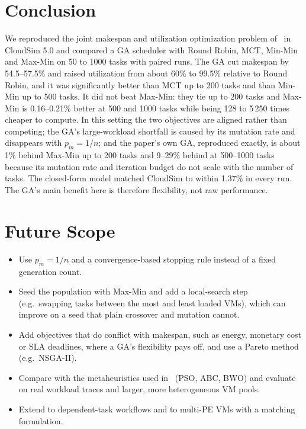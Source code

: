 \documentclass[journal,onecolumn,12pt]{IEEEtran}
\begin{document}
\section{Conclusion}
We reproduced the joint makespan and utilization optimization problem of~\cite{dehury} in CloudSim 5.0 and compared a GA scheduler with Round Robin, MCT, Min-Min and Max-Min on 50 to 1000 tasks with paired runs. The GA cut makespan by 54.5--57.5\% and raised utilization from about 60\% to 99.5\% relative to Round Robin, and it was significantly better than MCT up to 200 tasks and than Min-Min up to 500 tasks. It did not beat Max-Min: they tie up to 200 tasks and Max-Min is 0.16--0.21\% better at 500 and 1000 tasks while being 128 to 5\,250 times cheaper to compute. In this setting the two objectives are aligned rather than competing; the GA's large-workload shortfall is caused by its mutation rate and disappears with $p_m=1/n$; and the paper's own GA, reproduced exactly, is about 1\% behind Max-Min up to 200 tasks and 9--29\% behind at 500--1000 tasks because its mutation rate and iteration budget do not scale with the number of tasks. The closed-form model matched CloudSim to within 1.37\% in every run. The GA's main benefit here is therefore flexibility, not raw performance.

\section{Future Scope}
\begin{itemize}
\item Use $p_m=1/n$ and a convergence-based stopping rule instead of a fixed generation count.
\item Seed the population with Max-Min and add a local-search step (e.g.\ swapping tasks between the most and least loaded VMs), which can improve on a seed that plain crossover and mutation cannot.
\item Add objectives that do conflict with makespan, such as energy, monetary cost or SLA deadlines, where a GA's flexibility pays off, and use a Pareto method (e.g.\ NSGA-II).
\item Compare with the metaheuristics used in~\cite{dehury} (PSO, ABC, BWO) and evaluate on real workload traces and larger, more heterogeneous VM pools.
\item Extend to dependent-task workflows and to multi-PE VMs with a matching formulation.
\end{itemize}
\end{document}
